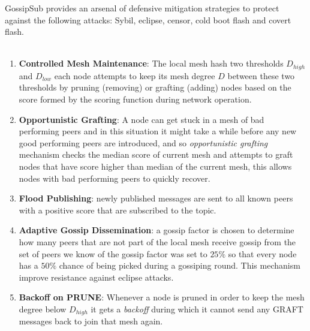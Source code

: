 \documentclass[12pt,twocolumn]{article}
\begin{document}
GossipSub provides an arsenal of defensive mitigation strategies to protect against the following attacks: Sybil, eclipse, censor, cold boot flash and covert flash.
\\
\\
\begin{enumerate}
    \item \textbf{Controlled Mesh Maintenance}: The local mesh hash two thresholds $D_{high}$ and $D_{low}$ 
        each node attempts to keep its mesh degree $D$ between these two thresholds by pruning (removing) or
        grafting (adding) nodes based on the score formed by the scoring function during network operation.

    \item \textbf{Opportunistic Grafting}: A node can get stuck in a mesh of bad performing peers and in this
        situation it might take a while before any new good performing peers are introduced, and so \emph{opportunistic
        grafting} mechanism checks the median score of current mesh and attempts to graft nodes that have score higher than
        median of the current mesh, this allows nodes with bad performing peers to quickly recover.

    \item \textbf{Flood Publishing}: newly published messages are sent to all known peers with a positive score that are
        subscribed to the topic.

    \item \textbf{Adaptive Gossip Dissemination}: a gossip factor is chosen to determine how many peers that are not part of the local mesh 
        receive gossip from the set of peers we know of the gossip factor was set to $25\%$ so that every node has a $50\%$
        chance of being picked during a gossiping round.
        This mechanism improve resistance against eclipse attacks.

    \item \textbf{Backoff on PRUNE}: Whenever a node is pruned in order to keep the mesh degree below $D_{high}$ it gets a \textit{backoff}
        during which it cannot send any GRAFT messages back to join that mesh again.
\end{enumerate}
\end{document}
